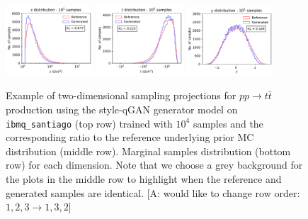 \documentclass[twocolumn,preprintnumbers,superscriptaddress]{revtex4-2}
\newcommand{\commentAF}[1]{{\color{cyan} {[A: #1]}}}
\begin{document}
\begin{figure}
  \includegraphics[width=0.29\textwidth]{plots/hardware/ibm_santiago/s-distribution_IBM_LHCdata_100k.pdf}%
  \includegraphics[width=0.29\textwidth]{plots/hardware/ibm_santiago/t-distribution_IBM_LHCdata_100k.pdf}%
  \includegraphics[width=0.29\textwidth]{plots/hardware/ibm_santiago/y-distribution_IBM_LHCdata_100k.pdf}

  \caption{\label{fig:ibm}Example of two-dimensional sampling projections for
  $pp \rightarrow t\bar{t}$ production using the style-qGAN generator
  model on {\tt ibmq\_santiago} (top row) trained with $10^4$ samples and
  the corresponding ratio to the reference underlying prior MC
  distribution (middle row). Marginal samples distribution (bottom row)
  for each dimension. Note that we choose a grey background for the plots in the middle row to highlight when the reference and generated samples are identical. \commentAF{would like to change row order: $1,2,3 \rightarrow 1,3,2$}}
\end{figure}
\end{document}
